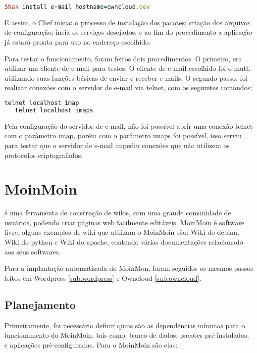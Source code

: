 \begin{lstlisting}[language=Ruby,label=dice_index,caption={Exemplo de execução de instalação do servidor de e-mailcom shak}]
Shak install e-mail hostname=owncloud.dev
\end{lstlisting}


E assim, o Chef inicia: o processo de instalação dos pacotes; criação dos arquivos
de configuração; incia os serviços desejados; e ao fim do procedimento a aplicação
já estará pronta para uso no endereço escolhido.

Para testar o funcionamento, foram feitos dois procedimentos. O primeiro, era utilizar
um cliente de e-mail para testes. O cliente de e-mail escolhido foi o mutt, utilizando
suas funções básicas de enviar e receber e-mails. O segundo passo, foi realizar conexões
com o servidor de e-mail via telnet, com os seguintes comandos:

\begin{lstlisting}[language=Ruby,label=dice_index,caption={Exemplo de teste de conexão telnet no servidor imap}]
   telnet localhost imap
   telnet localhost imaps
\end{lstlisting}

Pela configuração do servidor de e-mail, não foi possível abrir uma conexão telnet
com o parâmetro imap, porém com o parâmetro imaps foi possível, isso serviu para testar 
que o servidor de e-mail impediu conexões que não 
utilizem os protocolos criptografados.

\section{MoinMoin}
\label{sub:moinmoin}

\cite{moin} é uma ferramenta de construção
de wikis, com uma grande comunidade de usuários, podendo criar páginas web
facilmente editáveis. MoinMoin é software livre, alguns exemplos
de wiki que utilizam o MoinMoin são: Wiki do debian, Wiki do python e Wiki do apache,
contendo várias documentações relacionado aos seus softwares. 

Para a implantação automatizada do MoinMon, foram seguidos os mesmos passos
feitos em Wordpress \ref{sub:wordpress} e Owncloud \ref{sub:owncloud}.

\subsection{Planejamento}

Primeiramente, foi necessário definir quais são as dependências
mínimas para o funcionamento do MoinMoin, tais como: banco de dados; pacotes
pré-instalados; e aplicações pré-configuradas. Para o MoinMoin são elas:

